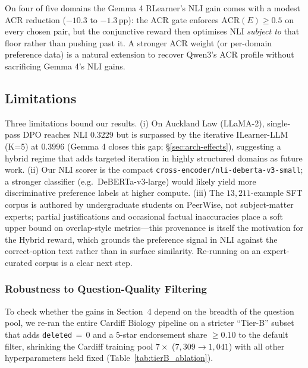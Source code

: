 On four of five domains the Gemma 4 RLearner's NLI gain comes with a modest ACR reduction ($-10.3$ to $-1.3$\,pp): the ACR gate enforces $\mathrm{ACR}(E)\geq 0.5$ on every chosen pair, but the conjunctive reward then optimises NLI \emph{subject to} that floor rather than pushing past it. A stronger ACR weight (or per-domain preference data) is a natural extension to recover Qwen3's ACR profile without sacrificing Gemma 4's NLI gains.

\subsection{Limitations}
\label{sec:discussion-limits}
Three limitations bound our results. (i) On Auckland Law (LLaMA-2), single-pass DPO reaches NLI $0.3229$ but is surpassed by the iterative ILearner-LLM (K=5) at $0.3996$ (Gemma 4 closes this gap; \S\ref{sec:arch-effects}), suggesting a hybrid regime that adds targeted iteration in highly structured domains as future work. (ii) Our NLI scorer is the compact \texttt{cross-encoder/nli-deberta-v3-small}; a stronger classifier (e.g.\ DeBERTa-v3-large) would likely yield more discriminative preference labels at higher compute. (iii) The $13{,}211$-example SFT corpus is authored by undergraduate students on PeerWise, not subject-matter experts; partial justifications and occasional factual inaccuracies place a soft upper bound on overlap-style metrics---this provenance is itself the motivation for the Hybrid reward, which grounds the preference signal in NLI against the correct-option text rather than in surface similarity. Re-running on an expert-curated corpus is a clear next step.

\subsubsection*{Robustness to Question-Quality Filtering}

To check whether the gains in Section~4 depend on the breadth of the question pool, we re-ran the entire Cardiff Biology pipeline on a stricter ``Tier-B'' subset that adds \texttt{deleted}\,${=}$\,0 and a $5$-star endorsement share $\geq 0.10$ to the default filter, shrinking the Cardiff training pool $7\times$ ($7{,}309 \to 1{,}041$) with all other hyperparameters held fixed (Table~\ref{tab:tierB_ablation}).

